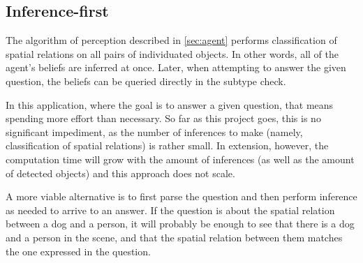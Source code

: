 \subsection{Inference-first}
\label{sec:discussion-inferencefirst}

The algorithm of perception described in \autoref{sec:agent} performs classification of spatial relations on all pairs of individuated objects.
In other words, all of the agent's beliefs are inferred at once.
Later, when attempting to answer the given question, the beliefs can be queried directly in the subtype check.

In this application, where the goal is to answer a given question, that means spending more effort than necessary.
So far as this project goes, this is no significant impediment, as the number of inferences to make (namely, classification of spatial relations) is rather small.
In extension, however, the computation time will grow with the amount of inferences (as well as the amount of detected objects) and this approach does not scale.

A more viable alternative is to first parse the question and then perform inference as needed to arrive to an answer.
If the question is about the spatial relation between a dog and a person, it will probably be enough to see that there is a dog and a person in the scene, and that the spatial relation between them matches the one expressed in the question.
